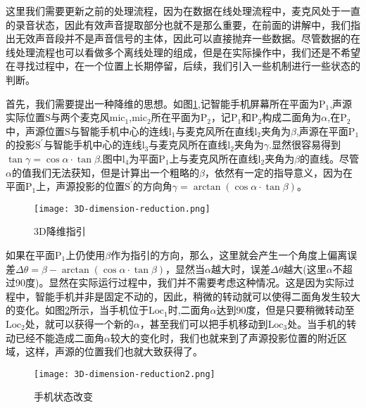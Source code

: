 \documentclass[winfonts]{njuthesis}
\begin{document}
			这里我们需要更新之前的处理流程，因为在数据在线处理流程中，麦克风处于一直的录音状态，因此有效声音提取部分也就不是那么重要，在前面的讲解中，我们指出无效声音段并不是声音信号的主体，因此可以直接抛弃一些数据。尽管数据的在线处理流程也可以看做多个离线处理的组成，但是在实际操作中，我们还是不希望在寻找过程中，在一个位置上长期停留，后续，我们引入一些机制进行一些状态的判断。
			
			首先，我们需要提出一种降维的思想。如图\ref{fig: 3D-dimension-reduction},记智能手机屏幕所在平面为$\text{P}_1$,声源实际位置$\text{S}$与两个麦克风$\text{mic}_1$,$\text{mic}_2$所在平面为$\text{P}_2$，记$\text{P}_1$和$\text{P}_2$构成二面角为$\alpha$,在$\text{P}_2$中，声源位置$\text{S}$与智能手机中心的连线$\text{l}_1$与麦克风所在直线$\text{l}_2$夹角为$\beta$,声源在平面$\text{P}_1$的投影$\text{S}^{'}$与智能手机中心的连线$\text{l}_3$与麦克风所在直线$\text{l}_2$夹角为$\gamma$.显然很容易得到$\tan \gamma = \cos \alpha \cdot \tan \beta$.图中$\text{l}_4$为平面$\text{P}_1$上与麦克风所在直线$\text{l}_2$夹角为$\beta$的直线。尽管$\alpha$的值我们无法获知，但是计算出一个粗略的$\beta$，依然有一定的指导意义，因为在平面$\text{P}_1$上，声源投影的位置$\text{S}^{'}$的方向角$\gamma = \arctan (\cos \alpha \cdot \tan \beta)$。
			
			\begin{figure}[H]
				\centering
				\texttt{[image: 3D-dimension-reduction.png]} 
				\caption{{3D降维指引}}
				\label{fig: 3D-dimension-reduction}
			\end{figure}
			
			如果在平面$\text{P}_1$上仍使用$\beta$作为指引的方向，那么，这里就会产生一个角度上偏离误差$\Delta \theta = \beta - \arctan (\cos \alpha \cdot \tan \beta)$，显然当$\alpha$越大时，误差$\Delta \theta$越大(这里$\alpha$不超过90度)。显然在实际运行过程中，我们并不需要考虑这种情况。这是因为实际过程中，智能手机并非是固定不动的，因此，稍微的转动就可以使得二面角发生较大的变化。如图\ref{fig: 3D-dimension-reduction2}所示，当手机位于$\text{Loc}_1$时,二面角$\alpha$达到90度，但是只要稍微转动至$\text{Loc}_2$处，就可以获得一个新的$\alpha$，甚至我们可以把手机移动到$\text{Loc}_3$处。当手机的转动已经不能造成二面角$\alpha$较大的变化时，我们也就来到了声源投影位置的附近区域，这样，声源的位置我们也就大致获得了。
			
			\begin{figure}[H]
				\centering
				\texttt{[image: 3D-dimension-reduction2.png]} 
				\caption{{手机状态改变}}
				\label{fig: 3D-dimension-reduction2}
			\end{figure}	
		
\end{document}

